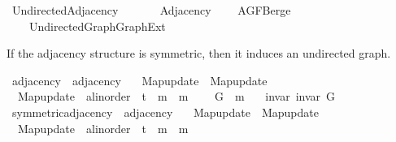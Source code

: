%
\begin{isabellebody}%
%
%
\isadelimdocument
%
\endisadelimdocument
%
\isatagdocument
%
\isamarkuptrue%
%
\endisatagdocument
{\isafolddocument}%
%
\isadelimdocument
%
\endisadelimdocument
%
\isadelimtheory
%
\endisadelimtheory
%
\isatagtheory
{}\isamarkupfalse%
\ Undirected{\isacharunderscore}{\kern0pt}Adjacency\isanewline
\ \ \isanewline
\ \ \ \ Adjacency\isanewline
\ \ \ \ AGF{\isachardot}{\kern0pt}Berge\isanewline
\ \ \ \ {\isachardoublequoteopen}{\isachardot}{\kern0pt}{\isachardot}{\kern0pt}{\isacharslash}{\kern0pt}Undirected{\isacharunderscore}{\kern0pt}Graph{\isacharslash}{\kern0pt}Graph{\isacharunderscore}{\kern0pt}Ext{\isachardoublequoteclose}\isanewline
{}%
\endisatagtheory
{\isafoldtheory}%
%
\isadelimtheory
%
\endisadelimtheory
%
\begin{isamarkuptext}%
If the adjacency structure is symmetric, then it induces an undirected graph.%
\end{isamarkuptext}\isamarkuptrue%
\isamarkupfalse%
\ adjacency{\isacharprime}{\kern0pt}\ {\isacharequal}{\kern0pt}\ adjacency\ \isanewline
\ \ Map{\isacharunderscore}{\kern0pt}update\ {\isacharequal}{\kern0pt}\ Map{\isacharunderscore}{\kern0pt}update\ \isanewline
\ \ Map{\isacharunderscore}{\kern0pt}update\ {\isacharcolon}{\kern0pt}{\isacharcolon}{\kern0pt}\ {\isachardoublequoteopen}{\isacharprime}{\kern0pt}a{\isacharcolon}{\kern0pt}{\isacharcolon}{\kern0pt}linorder\ {\isasymRightarrow}\ {\isacharprime}{\kern0pt}t\ {\isasymRightarrow}\ {\isacharprime}{\kern0pt}m\ {\isasymRightarrow}\ {\isacharprime}{\kern0pt}m{\isachardoublequoteclose}\ {\isacharplus}{\kern0pt}\isanewline
\ \ \ G\ {\isacharcolon}{\kern0pt}{\isacharcolon}{\kern0pt}\ {\isacharprime}{\kern0pt}m\isanewline
\ \ \ invar{\isacharcolon}{\kern0pt}\ {\isachardoublequoteopen}invar\ G{\isachardoublequoteclose}\isanewline
\isanewline
{}\isamarkupfalse%
\ symmetric{\isacharunderscore}{\kern0pt}adjacency\ {\isacharequal}{\kern0pt}\ adjacency{\isacharprime}{\kern0pt}\ \isanewline
\ \ Map{\isacharunderscore}{\kern0pt}update\ {\isacharequal}{\kern0pt}\ Map{\isacharunderscore}{\kern0pt}update\ \isanewline
\ \ Map{\isacharunderscore}{\kern0pt}update\ {\isacharcolon}{\kern0pt}{\isacharcolon}{\kern0pt}\ {\isachardoublequoteopen}{\isacharprime}{\kern0pt}a{\isacharcolon}{\kern0pt}{\isacharcolon}{\kern0pt}linorder\ {\isasymRightarrow}\ {\isacharprime}{\kern0pt}t\ {\isasymRightarrow}\ {\isacharprime}{\kern0pt}m\ {\isasymRightarrow}\ {\isacharprime}{\kern0pt}m{\isachardoublequoteclose}\ {\isacharplus}{\kern0pt}\isanewline

\end{isabellebody}
